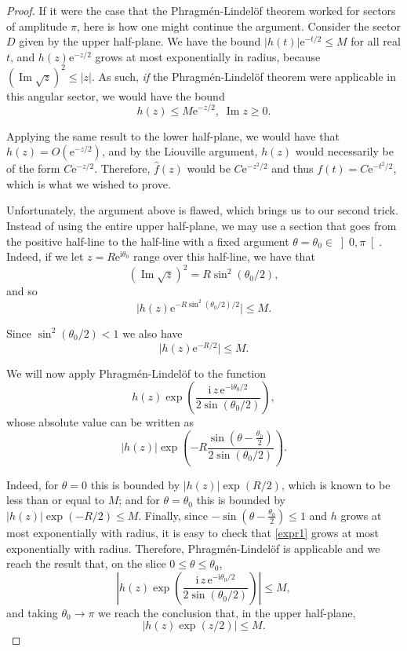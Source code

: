 \documentclass{amsart}
\newcommand{\e}{\mathrm{e}}
\newcommand{\I}{\mathrm{i}}
\DeclareMathOperator{\im}{Im}
\begin{document}
\begin{proof}
If it were the case that the Phragmén-Lindelöf theorem worked for sectors of amplitude $\pi$, here is how one might continue the argument. Consider the sector $D$ given by the upper half-plane. We have the bound $\lvert h(t) \rvert \e^{- t / 2} \leq M$  for all real $t$, and $h(z) \e^{- z/2}$ grows at most exponentially in radius, because $(\im \sqrt{z})^2 \leq \lvert z \rvert$. As such, \emph{if} the Phragmén-Lindelöf theorem were applicable in this angular sector, we would have the bound
\[h(z) \leq M \e^{- z/2}, \; \im z \geq 0.\]

Applying the same result to the lower half-plane, we would have that $h(z) = O(\e^{- z/2})$, and by the Liouville argument, $h(z)$ would necessarily be of the form $C \e^{- z/2}$. Therefore, $\hat f(z)$ would be $C \e^{- z^2/2}$ and thus $f(t) = C \e^{-t^2/2}$, which is what we wished to prove.

Unfortunately, the argument above is flawed, which brings us to our second trick. Instead of using the entire upper half-plane, we may use a section that goes from the positive half-line to the half-line with a fixed argument $\theta = \theta_0 \in \left]0, \pi\right[$. Indeed, if we let $z = R \e^{\I \theta_0}$ range over this half-line, we have that
\[(\im \sqrt{z})^2 = R \sin^2(\theta_0/2),\]
and so
\[\lvert h(z) \e^{-R \sin^2(\theta_0/2) / 2} \rvert \leq M.\]

Since $\sin^2(\theta_0/2) < 1$ we also have
\[\lvert h(z) \e^{-R/2} \rvert \leq M.\]

We will now apply Phragmén-Lindelöf to the function
\begin{equation}\label{expr1}
 h(z) \exp\left( \frac{\I \, z \, \e^{-\I \theta_0 / 2}}{2 \sin(\theta_0/2)}\right),
\end{equation}
whose absolute value can be written as
\[ \lvert h(z) \rvert \exp\left( - R \frac{\sin( \theta - \frac{\theta_0}2 )}{2 \sin(\theta_0 / 2)}\right).\] 

Indeed, for $\theta = 0$ this is bounded by $\lvert h(z) \rvert \exp(R/2)$, which is known to be less than or equal to $M$; and for $\theta = \theta_0$ this is bounded by $\lvert h(z) \rvert \exp(-R/2) \leq M$. Finally, since $-\sin(\theta - \frac{\theta_0}2) \leq 1$ and $h$ grows at most exponentially with radius, it is easy to check that \eqref{expr1} grows at most exponentially with radius. Therefore, Phragmén-Lindelöf is applicable and we reach the result that, on the slice $0 \leq \theta \leq \theta_0$,
\[\left\lvert h(z) \exp\left( \frac{\I \, z \, \e^{-\I \theta_0 / 2}}{2 \sin(\theta_0/2)}\right) \right\rvert \leq M,\]
and taking $\theta_0 \to \pi$ we reach the conclusion that, in the upper half-plane,
\[\lvert h(z) \exp(z/2) \rvert \leq M.\]


\end{proof}
\end{document}
